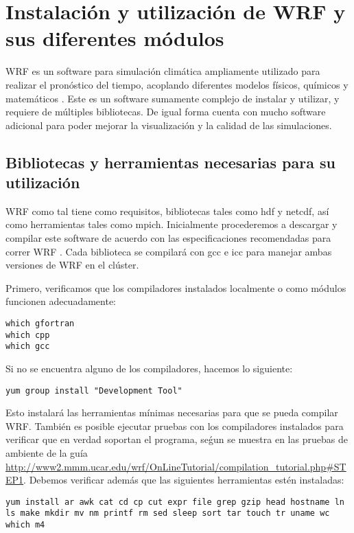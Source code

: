 \chapter{Instalación y utilización de WRF y sus diferentes módulos}
WRF es un software para simulación climática ampliamente utilizado para realizar el pronóstico del tiempo, acoplando diferentes modelos físicos, químicos y matemáticos \cite{wrf}. Este es un software sumamente complejo de instalar y utilizar, y requiere de múltiples bibliotecas. De igual forma cuenta con mucho software adicional para poder mejorar la visualización y la calidad de las simulaciones.

\section{Bibliotecas y herramientas necesarias para su utilización}
WRF como tal tiene como requisitos, bibliotecas tales como hdf y netcdf, así como herramientas tales como mpich. Inicialmente procederemos a descargar y compilar este software de acuerdo con las especificaciones recomendadas para correr WRF \cite{wrfguide}. Cada biblioteca se compilará con gcc e icc para manejar ambas versiones de WRF en el clúster. 

Primero, verificamos que los compiladores instalados localmente o como módulos funcionen adecuadamente:

\begin{lstlisting}
which gfortran
which cpp
which gcc
\end{lstlisting}

Si no se encuentra alguno de los compiladores, hacemos lo siguiente:

\begin{lstlisting}
yum group install "Development Tool"
\end{lstlisting}

Esto instalará las herramientas mínimas necesarias para que se pueda compilar WRF. También es posible ejecutar pruebas con los compiladores instalados para verificar que en verdad soportan el programa, seǵun se muestra en las pruebas de ambiente de la guía \url{http://www2.mmm.ucar.edu/wrf/OnLineTutorial/compilation_tutorial.php#STEP1}. Debemos verificar además que las siguientes herramientas estén instaladas:

\begin{lstlisting}
yum install ar awk cat cd cp cut expr file grep gzip head hostname ln ls make mkdir mv nm printf rm sed sleep sort tar touch tr uname wc which m4
\end{lstlisting}


